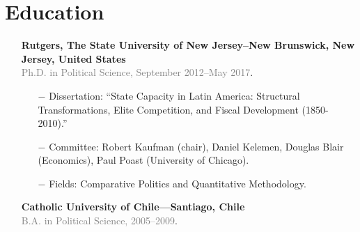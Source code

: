 \section*{Education}

\begin{itemize}
  \item[\textcolor{gray}{\textbullet}] {\bf Rutgers, The State University of New Jersey--New Brunswick, New Jersey, United States}\\
  \textcolor{gray}{Ph.D. in Political Science, September 2012--May 2017}.
    	\begin{itemize}
      		\item[$-$] Dissertation: ``State Capacity in Latin America: Structural Transformations, Elite Competition, and Fiscal Development (1850-2010).''
      		\item[$-$] Committee: Robert Kaufman (chair), Daniel Kelemen, Douglas Blair (Economics), Paul Poast (University of Chicago).
          \item[$-$] Fields: Comparative Politics and Quantitative Methodology.
		  \end{itemize}

\item[\textcolor{gray}{\textbullet}] {\bf Catholic University of Chile---Santiago, Chile}\\
\textcolor{gray}{B.A. in Political Science, 2005--2009}.
\end{itemize}
